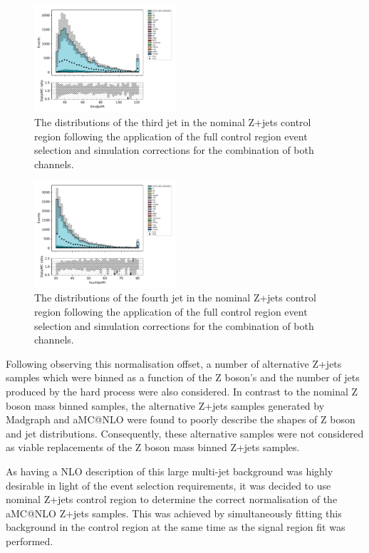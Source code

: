 \begin{figure}[tbp]
\centering
\includegraphics[width=0.47\textwidth]{figs/tzq-fullSelection-plots/plots_ee_zPlus/thirdJetPt.pdf}
\caption{
The distributions of the third jet \pt in the nominal Z+jets control region following the application of the full control region event selection and simulation corrections for the combination of both channels.
}
\label{fig:zPlusCR_thirdJetPt}
\end{figure}

\begin{figure}[tbp]
\centering
\includegraphics[width=0.47\textwidth]{figs/tzq-fullSelection-plots/plots_ee_zPlus/fourthJetPt.pdf}
\caption{
The distributions of the fourth jet \pt in the nominal Z+jets control region following the application of the full control region event selection and simulation corrections for the combination of both channels.
}
\label{fig:zPlusCR_fourthJetPt}
\end{figure}

Following observing this normalisation offset, a number of alternative Z+jets samples which were binned as a function of the Z boson's \pT and the number of jets produced by the hard process were also considered.
In contrast to the nominal Z boson mass binned samples, the alternative Z+jets samples generated by Madgraph and aMC@NLO were found to poorly describe the shapes of Z boson and jet distributions.
Consequently, these alternative samples were not considered as viable replacements of the Z boson mass binned Z+jets samples.

As having a NLO description of this large multi-jet background was highly desirable in light of the event selection requirements, it was decided to use nominal Z+jets control region to determine the correct normalisation of the aMC@NLO Z+jets samples.
This was achieved by simultaneously fitting this background in the control region at the same time as the signal region fit was performed.

